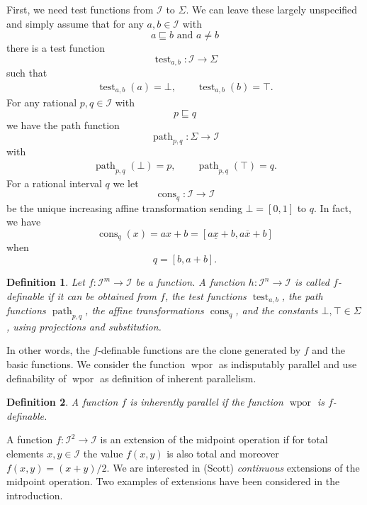 \documentclass[12pt]{article}
\newcommand{\path}[2]{\operatorname{path}_{#1,#2}}
\newcommand{\test}[2]{\operatorname{test}_{#1,#2}}
\newcommand{\cons}[1]{\operatorname{cons}_{#1}}
\newcommand{\wpor}{\operatorname{wpor}}
\newtheorem{definition}{Definition}[section]
\newenvironment{defn}{\begin{definition}\em}{\end{definition}}
\newcommand{\meet}{\sqcap}
\newcommand{\arr}{\to}%
\newcommand{\I}{\mathcal{I}}
\begin{document}
First, we need test functions from $\I$ to $\Sigma$. We can leave
these largely unspecified and simply assume that for any $a,b\in\I$
with
\[
\text{$a\sqsubseteq b$ and $a \ne b$} 
\]
there is a test function
\[
\test{a}{b}:\I\arr \Sigma
\]
such that
\begin{gather*}
\test{a}{b}(a)=\bot, \qquad
\test{a}{b}(b)=\top.
\end{gather*}
%
For any rational $p,q\in \I$ with 
\[
p \sqsubseteq q
\]
we
have the path function 
\[
\path{p}{q} : \Sigma\to \I 
\]
with
\begin{gather*}
\path{p}{q}(\bot)=p, \qquad
\path{p}{q}(\top)=q.
\end{gather*}
%
For a rational interval $q$ we let 
\[
\cons{q}:\I\arr\I
\]
be the unique increasing affine transformation sending $\bot=[0,1]$ to
$q$. In fact, we have 
\[
\cons{q}(x)=a x+b = [a \underline{x}+b, a \overline{x}+b]
\]
when 
\[
q=[b,a+b].
\]
\begin{defn}
  Let $f:\I^m \to \I$ be a function.  A function $h:\I^n \to \I$ is
  called $f$-definable if it can be obtained from $f$, the test
  functions $\test{a}{b}$, the path functions $\path{p}{q}$, the
  affine transformations $\cons{q}$, and the constants
  $\bot,\top\in\Sigma$, using projections and substitution.
\end{defn}
In other words, the $f$-definable functions are the clone generated by
$f$ and the basic functions.
%
We consider the function $\wpor$ as indisputably parallel and use
definability of $\wpor$ as definition of inherent parallelism.
\begin{defn}
A function $f$ is \emph{inherently parallel} if the function $\wpor$
is $f$-definable. 
\end{defn}
A function $f:\I^2 \arr \I$ is an extension of the midpoint
operation if for total elements $x,y\in \I$ the value $f(x,y)$ is also
total and moreover
$
f(x,y) = (x+y)/2.
$
We are interested in (Scott) \emph{continuous} extensions of the
midpoint operation.  Two examples of extensions have been considered in
the introduction.
\end{document}
